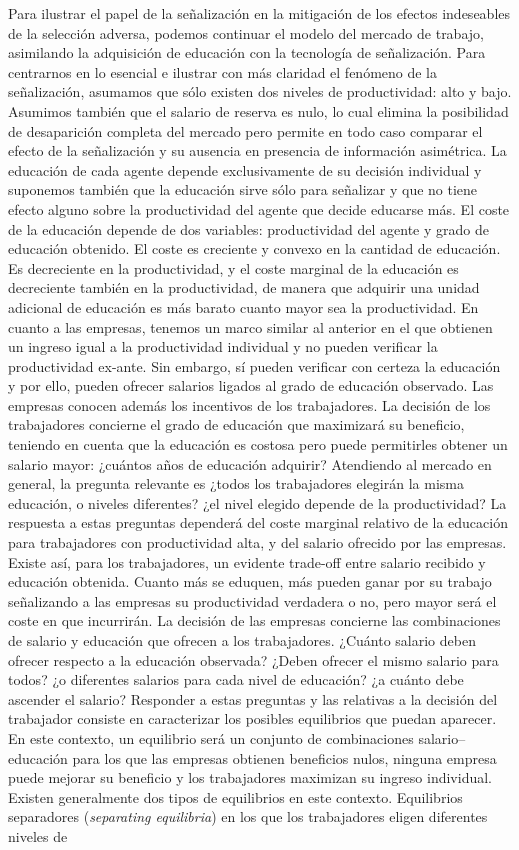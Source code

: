 \documentclass{nuevotema}
\begin{document}
Para ilustrar el papel de la señalización en la mitigación de los efectos indeseables de la selección adversa, podemos continuar el modelo del mercado de trabajo, asimilando la adquisición de educación con la tecnología de señalización. Para centrarnos en lo esencial e ilustrar con más claridad el fenómeno de la señalización, asumamos que sólo existen dos niveles de productividad: alto y bajo. Asumimos también que el salario de reserva es nulo, lo cual elimina la posibilidad de desaparición completa del mercado pero permite en todo caso comparar el efecto de la señalización y su ausencia en presencia de información asimétrica. La educación de cada agente depende exclusivamente de su decisión individual y suponemos también que la educación sirve sólo para señalizar y que no tiene efecto alguno sobre la productividad del agente que decide educarse más. El coste de la educación depende de dos variables: productividad del agente y grado de educación obtenido. El coste es creciente y convexo en la cantidad de educación. Es decreciente en la productividad, y el coste marginal de la educación es decreciente también en la productividad, de manera que adquirir una unidad adicional de educación es más barato cuanto mayor sea la productividad. En cuanto a las empresas, tenemos un marco similar al anterior en el que obtienen un ingreso igual a la productividad individual y no pueden verificar la productividad ex-ante. Sin embargo, sí pueden verificar con certeza la educación y por ello, pueden ofrecer salarios ligados al grado de educación observado. Las empresas conocen además los incentivos de los trabajadores. La decisión de los trabajadores concierne el grado de educación que maximizará su beneficio, teniendo en cuenta que la educación es costosa pero puede permitirles obtener un salario mayor: ¿cuántos años de educación adquirir? Atendiendo al mercado en general, la pregunta relevante es ¿todos los trabajadores elegirán la misma educación, o niveles diferentes? ¿el nivel elegido depende de la productividad? La respuesta a estas preguntas dependerá del coste marginal relativo de la educación para trabajadores con productividad alta, y del salario ofrecido por las empresas. Existe así, para los trabajadores, un evidente trade-off entre salario recibido y educación obtenida. Cuanto más se eduquen, más pueden ganar por su trabajo señalizando a las empresas su productividad verdadera o no, pero mayor será el coste en que incurrirán. La decisión de las empresas concierne las combinaciones de salario y educación que ofrecen a los trabajadores. ¿Cuánto salario deben ofrecer respecto a la educación observada? ¿Deben ofrecer el mismo salario para todos? ¿o diferentes salarios para cada nivel de educación? ¿a cuánto debe ascender el salario? Responder a estas preguntas y las relativas a la decisión del trabajador consiste en caracterizar los posibles equilibrios que puedan aparecer. En este contexto, un equilibrio será un conjunto de combinaciones salario--educación para los que las empresas obtienen beneficios nulos, ninguna empresa puede mejorar su beneficio y los trabajadores maximizan su ingreso individual. Existen generalmente dos tipos de equilibrios en este contexto. Equilibrios separadores (\textit{separating equilibria}) en los que los trabajadores eligen diferentes niveles de 
\end{document}
